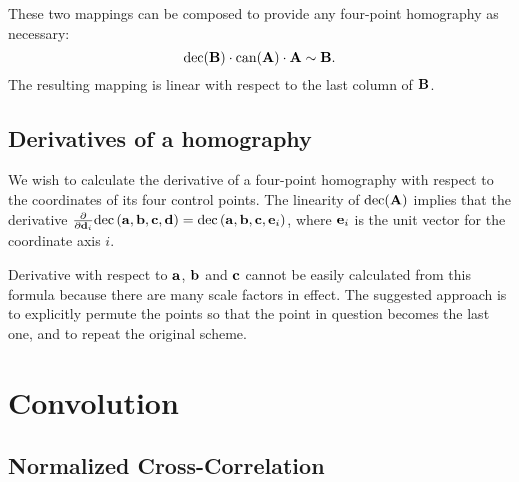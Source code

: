 These two mappings can be composed to provide any four-point homography as necessary:
$$\mathrm{dec}(\mathbf{B}) \cdot \mathrm{can}(\mathbf{A}) \cdot \mathbf{A} \sim \mathbf{B}.$$
The resulting mapping is linear with respect to the last column of $\mathbf{B}$.


\subsection{Derivatives of a homography}

We wish to calculate the derivative of a four-point homography with respect to the coordinates of its four control points.
The linearity of $\mathrm{dec}(\mathbf{A})$ implies that the derivative $\frac{\partial} {\partial \mathbf{d}_i} \mathrm{dec} \left( \mathbf{a}, \mathbf{b}, \mathbf{c}, \mathbf{d} \right) = \mathrm{dec} \left( \mathbf{a}, \mathbf{b}, \mathbf{c}, \mathbf{e}_i \right)$, where $\mathbf{e}_i$ is the unit vector for the coordinate axis $i$.

Derivative with respect to $\mathbf{a}$, $\mathbf{b}$ and $\mathbf{c}$ cannot be easily calculated from this formula because there are many scale factors in effect.
The suggested approach is to explicitly permute the points so that the point in question becomes the last one, and to repeat the original scheme.


\section{Convolution}

\subsection{Normalized Cross-Correlation}


